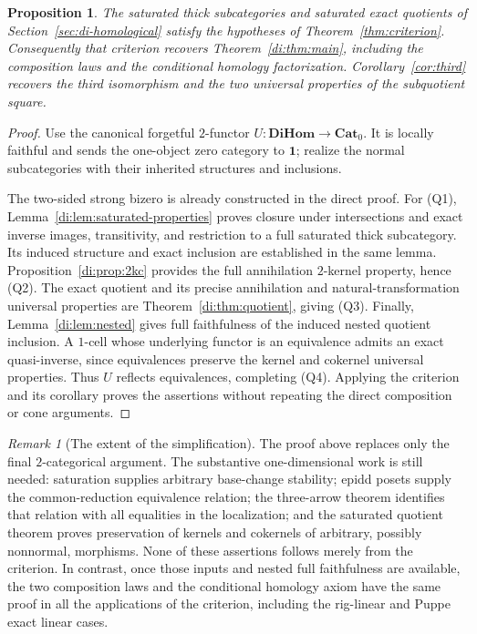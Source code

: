 \documentclass[11pt,reqno,a4paper]{amsart}
\newtheorem{proposition}[theorem]{Proposition}
\theoremstyle{definition}
\theoremstyle{remark}
\newtheorem{remark}[theorem]{Remark}
\newcommand{\0}{\mathbf{0}}
\renewcommand{\1}{\mathbf{1}}
\newcommand{\Pt}{\mathbf{Cat}_{0}}
\newcommand{\DiHom}{\mathbf{DiHom}}
\begin{document}
\begin{proposition}\label{prop:di-criterion-revisited}
The saturated thick subcategories and saturated exact quotients of
Section~\ref{sec:di-homological} satisfy the hypotheses of
Theorem~\ref{thm:criterion}. Consequently that criterion recovers
Theorem~\ref{di:thm:main}, including the composition laws and the
conditional homology factorization. Corollary~\ref{cor:third}
recovers the third isomorphism and the two universal properties of
the subquotient square.
\end{proposition}
\begin{proof}
Use the canonical forgetful $2$-functor $U:\DiHom\to\Pt$.
It is locally faithful and sends the one-object zero category
to $\mathbf1$; realize the normal subcategories with their
inherited structures and inclusions.

The two-sided strong bizero is already constructed in the direct
proof. For (Q1), Lemma~\ref{di:lem:saturated-properties} proves
closure under intersections and exact inverse images, transitivity,
and restriction to a full saturated thick subcategory. Its induced
structure and exact inclusion are established in the same lemma.
Proposition~\ref{di:prop:2kc} provides the full annihilation
$2$-kernel property, hence (Q2). The exact quotient and its precise
annihilation and natural-transformation universal properties are
Theorem~\ref{di:thm:quotient}, giving (Q3). Finally,
Lemma~\ref{di:lem:nested} gives full faithfulness of the induced
nested quotient inclusion. A $1$-cell whose underlying functor
is an equivalence admits an exact quasi-inverse, since equivalences
preserve the kernel and cokernel universal properties. Thus $U$
reflects equivalences, completing (Q4). Applying the criterion and its corollary proves the
assertions without repeating the direct composition or cone arguments.
\end{proof}

\begin{remark}[The extent of the simplification]
The proof above replaces only the final $2$-categorical argument.
The substantive one-dimensional work is still needed: saturation
supplies arbitrary base-change stability; epidd posets supply the
common-reduction equivalence relation; the three-arrow theorem
identifies that relation with all equalities in the localization;
and the saturated quotient theorem proves preservation of kernels
and cokernels of arbitrary, possibly nonnormal, morphisms. None of
these assertions follows merely from the criterion. In contrast,
once those inputs and nested full faithfulness are available, the
two composition laws and the conditional homology axiom have the
same proof in all the applications of the criterion, including the
rig-linear and Puppe exact linear cases.
\end{remark}
\end{document}
